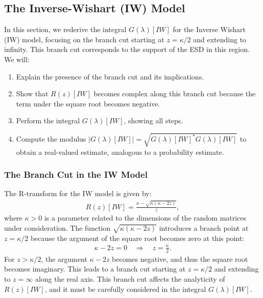 \subsection{The Inverse-Wishart (IW) Model}
\label{sxn:IW}
In this section, we rederive the integral $G(\lambda)[IW]$ for the Inverse Wishart (IW) model, focusing on the branch cut starting at $z = \kappa/2$ and extending to infinity. 
This branch cut corresponds to the support of the ESD in this region. 
We will:
\begin{enumerate}
\item Explain the presence of the branch cut and its implications.
\item Show that $R(z)[IW]$ becomes complex along this branch cut because the term under the square root becomes negative.
\item Perform the integral $G(\lambda)[IW]$, showing all steps.
\item Compute the modulus $|G(\lambda)[IW]| = \sqrt{ G(\lambda)[IW]^* G(\lambda)[IW] }$ to obtain a real-valued estimate, analogous to a probability estimate.
\end{enumerate}

\subsubsection{The Branch Cut in the IW Model}

The R-transform for the IW model is given by:
\begin{align}
\label{eqn:iw_r_transf}
R(z)[IW] = \frac{\kappa - \sqrt{\kappa(\kappa - 2z)}}{z},
\end{align}
where $\kappa > 0$ is a parameter related to the dimensions of the random matrices under consideration.
The function $\sqrt{\kappa(\kappa - 2z)}$ introduces a branch point at $z = \kappa/2$ because the argument of the square root becomes zero at this point:
\begin{align}
\kappa - 2z = 0 \quad \Rightarrow \quad z = \frac{\kappa}{2}.
\end{align}
For $z > \kappa/2$, the argument $\kappa - 2z$ becomes negative, and thus the square root becomes imaginary. 
This leads to a branch cut starting at $z = \kappa/2$ and extending to $z = \infty$ along the real axis. 
This branch cut affects the analyticity of $R(z)[IW]$, and it must be carefully considered in the integral $G(\lambda)[IW]$.

